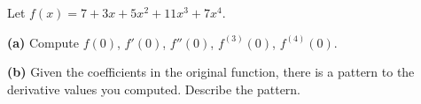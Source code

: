 Let $f(x) = 7 + 3 x + 5 x^2 + 11 x^3 + 7 x^4$.

\medskip \noindent \textbf{(a)} Compute $f(0)$, $f'(0)$, $f''(0)$, $f^{(3)}(0)$, $f^{(4)}(0)$.

\vspace{60mm}

\medskip \noindent \textbf{(b)} Given the coefficients in the original function, there is a pattern to the derivative values you computed.  Describe the pattern.
